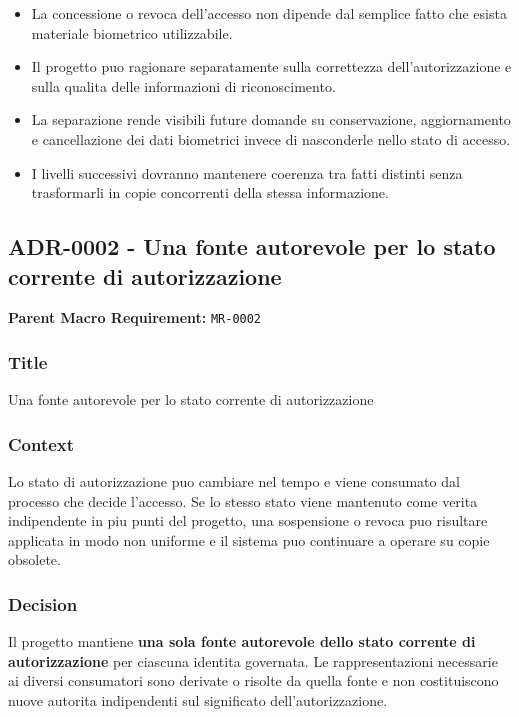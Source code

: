\documentclass[
  10pt,
]{article}
\providecommand{\tightlist}{%
  \setlength{\itemsep}{0pt}\setlength{\parskip}{0pt}}
\begin{document}
\begin{itemize}
\tightlist
\item
  La concessione o revoca dell'accesso non dipende dal semplice fatto
  che esista materiale biometrico utilizzabile.
\item
  Il progetto puo ragionare separatamente sulla correttezza
  dell'autorizzazione e sulla qualita delle informazioni di
  riconoscimento.
\item
  La separazione rende visibili future domande su conservazione,
  aggiornamento e cancellazione dei dati biometrici invece di
  nasconderle nello stato di accesso.
\item
  I livelli successivi dovranno mantenere coerenza tra fatti distinti
  senza trasformarli in copie concorrenti della stessa informazione.
\end{itemize}

\subsection{ADR-0002 - Una fonte autorevole per lo stato corrente di
autorizzazione}\label{adr-0002---una-fonte-autorevole-per-lo-stato-corrente-di-autorizzazione}

\textbf{Parent Macro Requirement:} \texttt{MR-0002}

\subsubsection{Title}\label{title-3}

Una fonte autorevole per lo stato corrente di autorizzazione

\subsubsection{Context}\label{context-3}

Lo stato di autorizzazione puo cambiare nel tempo e viene consumato dal
processo che decide l'accesso. Se lo stesso stato viene mantenuto come
verita indipendente in piu punti del progetto, una sospensione o revoca
puo risultare applicata in modo non uniforme e il sistema puo continuare
a operare su copie obsolete.

\subsubsection{Decision}\label{decision-3}

Il progetto mantiene \textbf{una sola fonte autorevole dello stato
corrente di autorizzazione} per ciascuna identita governata. Le
rappresentazioni necessarie ai diversi consumatori sono derivate o
risolte da quella fonte e non costituiscono nuove autorita indipendenti
sul significato dell'autorizzazione.
\end{document}
